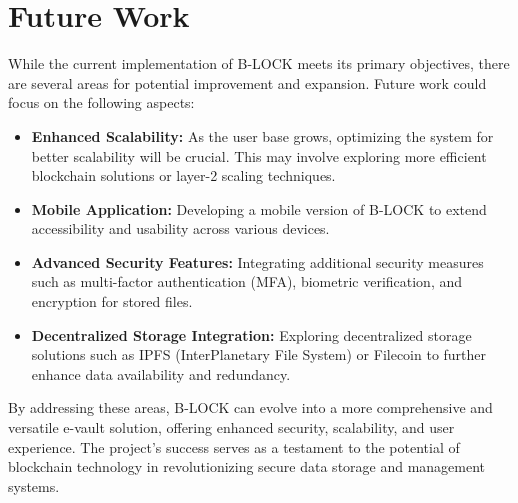 \documentclass[12pt,a4paper]{report}
\begin{document}
\section{Future Work}
While the current implementation of B-LOCK meets its primary objectives, there are several areas for potential improvement and expansion. Future work could focus on the following aspects:
\begin{itemize}
   \item \textbf{Enhanced Scalability:} As the user base grows, optimizing the system for better scalability will be crucial. This may involve exploring more efficient blockchain solutions or layer-2 scaling techniques.
   \item \textbf{Mobile Application:} Developing a mobile version of B-LOCK to extend accessibility and usability across various devices.
   \item \textbf{Advanced Security Features:} Integrating additional security measures such as multi-factor authentication (MFA), biometric verification, and encryption for stored files.
   \item \textbf{Decentralized Storage Integration:} Exploring decentralized storage solutions such as IPFS (InterPlanetary File System) or Filecoin to further enhance data availability and redundancy.
\end{itemize}
By addressing these areas, B-LOCK can evolve into a more comprehensive and versatile e-vault solution, offering enhanced security, scalability, and user experience. The project's success serves as a testament to the potential of blockchain technology in revolutionizing secure data storage and management systems.






\newpage

\pagestyle{plain}
\renewcommand{\bibname}{References}


\printbibliography
\end{document}
